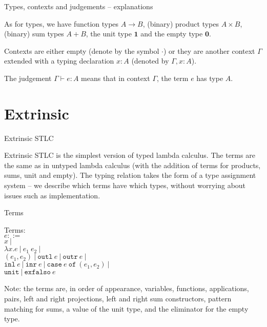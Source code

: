\documentclass{beamer}
\newcommand{\pipe}{\ |\ }
\newcommand{\Fun}[2]{#1 \to #2}
\newcommand{\Prod}[2]{#1 \times #2}
\newcommand{\Sum}[2]{#1 + #2}
\newcommand{\Unit}{\textbf{1}}
\newcommand{\Empty}{\textbf{0}}
\newcommand{\fun}[2]{\lambda #1. #2}
\newcommand{\app}[2]{#1\ #2}
\newcommand{\pair}[2]{(#1, #2)}
\newcommand{\outl}[1]{\texttt{outl}\ #1}
\newcommand{\outr}[1]{\texttt{outr}\ #1}
\newcommand{\inl}[1]{\texttt{inl}\ #1}
\newcommand{\inr}[1]{\texttt{inr}\ #1}
\newcommand{\case}[3]{\texttt{case}\ #1\ \texttt{of}\ (#2, #3)}
\newcommand{\unit}{\texttt{unit}}
\newcommand{\exfalso}[1]{\texttt{exfalso}\ #1}
\newcommand{\fulltyping}[3]{#1 \vdash #2 : #3}
\newcommand{\emptytypingctx}{\cdot}
\newcommand{\extend}[3]{#1, #2 : #3}
\begin{document}
\begin{frame}{Types, contexts and judgements -- explanations}

As for types, we have function types $\Fun{A}{B}$, (binary) product types $\Prod{A}{B}$, (binary) sum types $\Sum{A}{B}$, the unit type $\Unit$ and the empty type $\Empty$.

\vspace{2em}

Contexts are either empty (denote by the symbol $\emptytypingctx$) or they are another context $\Gamma$ extended with a typing declaration $x : A$ (denoted by $\extend{\Gamma}{x}{A}$).

\vspace{2em}

The judgement $\fulltyping{\Gamma}{e}{A}$ means that in context $\Gamma$, the term $e$ has type $A$.

\end{frame}

\section{Extrinsic}

\begin{frame}{Extrinsic STLC}

Extrinsic STLC is the simplest version of typed lambda calculus. The terms are the same as in untyped lambda calculus (with the addition of terms for products, sums, unit and empty). The typing relation takes the form of a type assignment system -- we describe which terms have which types, without worrying about issues such as implementation.

\end{frame}

\begin{frame}{Terms}

Terms: \\
$e ::=$ \\
\qquad $x \pipe$ \\
\qquad $\fun{x}{e} \pipe \app{e_1}{e_2} \pipe$ \\
\qquad $\pair{e_1}{e_2} \pipe \outl{e} \pipe \outr{e} \pipe$ \\
\qquad $\inl{e} \pipe \inr{e} \pipe \case{e}{e_1}{e_2} \pipe$ \\
\qquad $\unit \pipe \exfalso{e}$

\vspace{2em}

Note: the terms are, in order of appearance, variables, functions, applications, pairs, left and right projections, left and right sum constructors, pattern matching for sums, a value of the unit type, and the eliminator for the empty type.

\end{frame}
\end{document}
